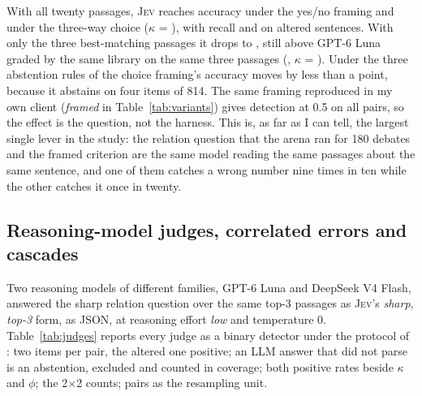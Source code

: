 \documentclass[11pt,a4paper]{article}
\newcommand{\jev}{\textsc{Jev}}
\begin{document}
With all twenty passages, \jev{} reaches \arAllJevnoulframedAcc{} accuracy under the yes/no framing and \arAllJevchoiceAcc{} under the three-way choice ($\kappa$ = \arAllJevchoiceKappa{}), with recall \arAllJevnoulframedRec{} and \arAllJevchoiceRec{} on altered sentences. With only the three best-matching passages it drops to \arTopJevchoiceAcc{}, still above GPT-6 Luna graded by the same library on the same three passages (\arTopLlmopenaigptSixlunaAcc{}, $\kappa$ = \arTopLlmopenaigptSixlunaKappa{}). Under the three abstention rules of \citet{rao2026agreement} the choice framing's accuracy moves by less than a point, because it abstains on four items of 814. The same framing reproduced in my own client (\emph{framed} in Table~\ref{tab:variants}) gives detection \detFiftyFramedTwoZero{} at 0.5 on all pairs, so the effect is the question, not the harness. This is, as far as I can tell, the largest single lever in the study: the relation question that the arena ran for 180 debates and the framed criterion are the same model reading the same passages about the same sentence, and one of them catches a wrong number nine times in ten while the other catches it once in twenty.

\subsection{Reasoning-model judges, correlated errors and cascades}
\label{sec:llm}

Two reasoning models of different families, GPT-6 Luna and DeepSeek V4 Flash, answered the sharp relation question over the same top-3 passages as \jev{}'s \emph{sharp, top-3} form, as JSON, at reasoning effort \emph{low} and temperature 0. Table~\ref{tab:judges} reports every judge as a binary detector under the protocol of \citet{rao2026agreement}: two items per pair, the altered one positive; an LLM answer that did not parse is an abstention, excluded and counted in coverage; both positive rates beside $\kappa$ and $\phi$; the 2$\times$2 counts; pairs as the resampling unit.

\begin{table}[t]
\centering\small
{}
\caption{Every judge as a binary contradiction detector on the same items. Coverage is the share of items with a usable answer. $p_{\text{judge}}$ and $p_{\text{label}}$ are the positive rates; the label rate is 50\% by construction.}
\label{tab:judges}
\end{table}
\end{document}

